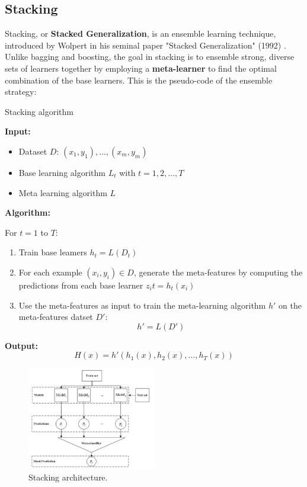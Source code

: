 \newpage

\subsection{Stacking}
\label{sec: Stacking}
Stacking, or \textbf{Stacked Generalization}, is an ensemble learning technique, introduced by Wolpert in his seminal paper "Stacked Generalization" (1992) \cite{wolpert1992stacked}. Unlike bagging and boosting, the goal in stacking is to ensemble strong, diverse sets of learners together by employing a \textbf{meta-learner} to find the optimal combination of the base learners. This is the pseudo-code of the ensemble strategy:
\begin{tcolorbox}[colback=blue!5, colframe=blue!80, boxrule=0pt]
    \begin{algorithm} [H]
        \caption{Stacking algorithm}
        \label{alg:Stacking algorithm}
        \textbf{Input:}
        \begin{itemize}
            \item Dataset $D$: ${(x_1, y_1),\dots,(x_m, y_m)}$
            \item Base learning algorithm $L_t$ with $t = 1,2,\dots,T$
            \item Meta learning algorithm $L$
        \end{itemize}
        \textbf{Algorithm:}
        
        For $t = 1$ to $T$:
        \begin{enumerate}
             \item Train base leamers $h_t = L(D_t)$
             \item For each example $(x_i, y_i) \in D$, generate the meta-features by computing the predictions from each base learner $z_it = h_t(x_i)$ 
        \item Use the meta-features as input to train the meta-learning algorithm $h'$ on the meta-features datset $D'$:
        \[
        h' = L(D')
        \]
    \end{enumerate}   
    \textbf{Output:}
    \[
    H(x) = h'(h_1(x), h_2(x), \dots, h_T(x))
    \]
    \end{algorithm}
\end{tcolorbox}

\begin{figure}[H] 
    \centering
    \includegraphics[width=0.5\textwidth]{Machine_learning_thesis/Images/Stacking.png}
    \caption{Stacking architecture.} 
    \label{fig: Stacking} 
\end{figure}


